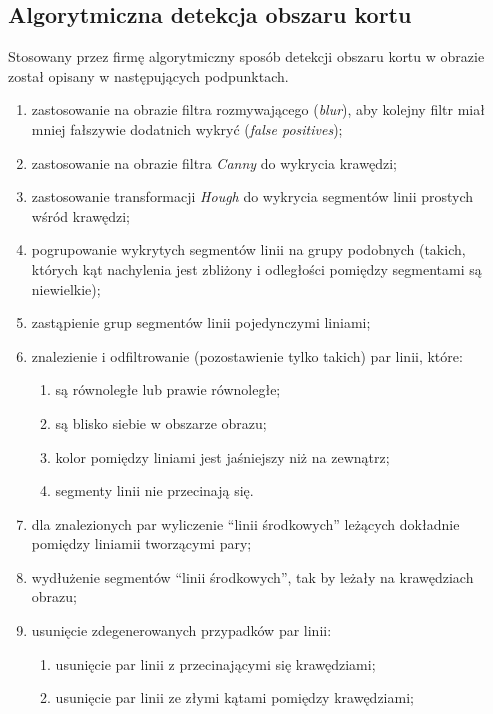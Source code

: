\subsection{Algorytmiczna detekcja obszaru kortu}
\label{sec:aglorytmiczna_detekcja}

Stosowany przez firmę \blue{} algorytmiczny sposób detekcji obszaru kortu w obrazie został opisany w następujących podpunktach.

\begin{enumerate}
  \item zastosowanie na obrazie filtra rozmywającego (\textit{blur}), aby kolejny filtr miał mniej fałszywie dodatnich wykryć (\textit{false positives});
  \item zastosowanie na obrazie filtra \textit{Canny} do wykrycia krawędzi;
  \item zastosowanie transformacji \textit{Hough} do wykrycia segmentów linii prostych wśród krawędzi;
  \item pogrupowanie wykrytych segmentów linii na grupy podobnych (takich, których kąt nachylenia jest zbliżony i odległości pomiędzy segmentami są niewielkie);
  \item zastąpienie grup segmentów linii pojedynczymi liniami;
  \item znalezienie i odfiltrowanie (pozostawienie tylko takich) par linii, które:
        \begin{enumerate}
          \item są równoległe lub prawie równoległe;
          \item są blisko siebie w obszarze obrazu;
          \item kolor pomiędzy liniami jest jaśniejszy niż na zewnątrz;
          \item segmenty linii nie przecinają się.
        \end{enumerate}
  \item dla znalezionych par wyliczenie  ``linii środkowych'' leżących dokładnie pomiędzy liniamii tworzącymi pary;
  \item wydłużenie segmentów ``linii środkowych'', tak by leżały na krawędziach obrazu;
  \item usunięcie zdegenerowanych przypadków par linii:
        \begin{enumerate}
          \item usunięcie par linii z przecinającymi się krawędziami;
          \item usunięcie par linii ze złymi kątami pomiędzy krawędziami;

\end{enumerate}
\end{enumerate}

